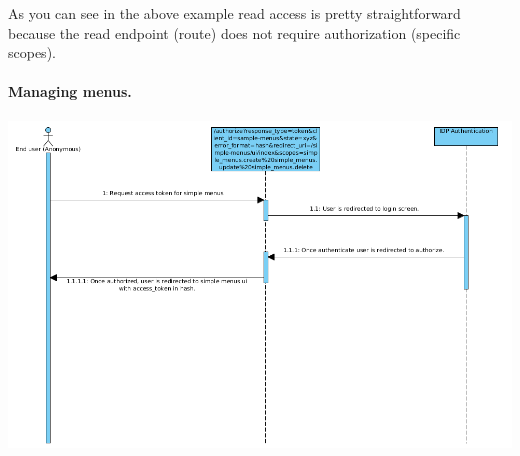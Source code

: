 \documentclass[letterpaper,10pt,english]{sphinxmanual}
\begin{document}
As you can see in the above example read access is pretty straightforward because the read endpoint (route) does not require
authorization (specific scopes).


\paragraph{Managing menus.}
\label{features/oauth2/simple_api_example:oauth-create-new-menu}\label{features/oauth2/simple_api_example:managing-menus}
\includegraphics{simple_menu_create.png}
\end{document}
